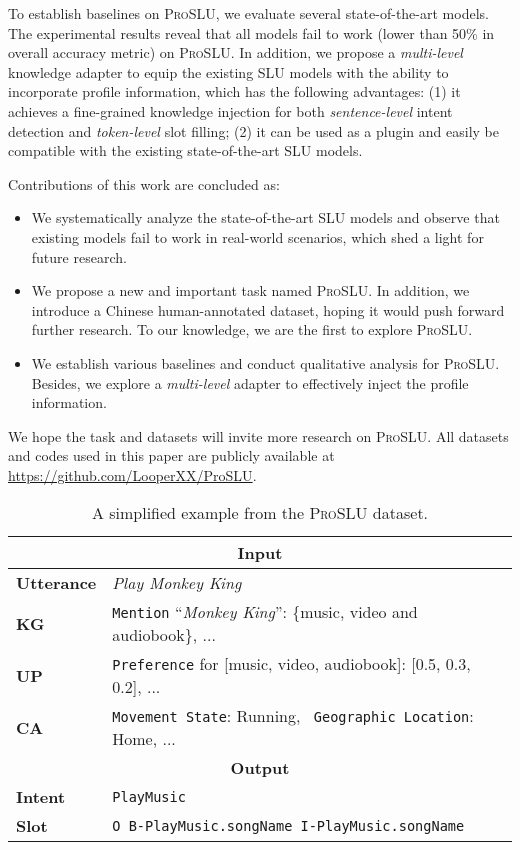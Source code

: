 \documentclass[letterpaper]{article} \usepackage{aaai22}  \usepackage{times}  \usepackage{helvet}  \usepackage{courier}  \usepackage[hyphens]{url}  \usepackage{graphicx} \urlstyle{rm} \def\UrlFont{\rm}  \usepackage{natbib}  \usepackage{caption} \DeclareCaptionStyle{ruled}{labelfont=normalfont,labelsep=colon,strut=off} \frenchspacing  \setlength{\pdfpagewidth}{8.5in}  \setlength{\pdfpageheight}{11in}  \usepackage{algorithm}
\begin{document}
To establish baselines on \textsc{ProSLU}, we evaluate several state-of-the-art models. The experimental results reveal that all models fail to work (lower than 50\% in overall accuracy metric) on \textsc{ProSLU}.
In addition, we propose a \textit{multi-level} knowledge adapter to equip the existing SLU models with the ability to incorporate profile information, which has the following advantages: 
(1) it achieves a fine-grained knowledge injection for both \textit{sentence-level} intent detection and \textit{token-level} slot filling; 
(2) it can be used as a plugin and easily be compatible with the existing state-of-the-art SLU models.


Contributions of this work are concluded as: 
\begin{itemize}
	\item We systematically analyze the state-of-the-art SLU models and observe that existing models fail to work in real-world scenarios, which shed a light for future research.
	\item 
	We propose a new and important task named \textsc{ProSLU}. In addition, we introduce a Chinese human-annotated dataset, hoping it would push forward further research. 
	To our knowledge, we are the first to explore \textsc{ProSLU}.
	\item We establish various baselines and conduct qualitative analysis for \textsc{ProSLU}. 
	Besides, we explore a \textit{multi-level} adapter to effectively inject the profile information.
\end{itemize}

We hope the task and datasets will invite more research on \textsc{ProSLU}. All datasets and codes used in this paper are publicly available at \url{https://github.com/LooperXX/ProSLU}. \begin{table}[t]
	\centering
	\begin{adjustbox}{width=0.48\textwidth}
		\begin{tabular}{l|l}
			\hline 
			\multicolumn{2}{c}{\textbf{Input}} \\ \hline
			\textbf{Utterance} & \textit{Play Monkey King} \\ \hline
			\textbf{KG} & \texttt{Mention} ``\textit{Monkey King}'': \{music, video and audiobook\}, ...\\ \hline
			\textbf{UP} & \texttt{Preference} for [music, video, audiobook]: {[}0.5, 0.3, 0.2{]},  ... \\ \hline
			\textbf{CA} & \texttt{Movement State}: Running, \ \texttt{Geographic Location}: Home, ... \\ \hline
			\hline
			\multicolumn{2}{c}{\textbf{Output}} \\ \hline
			\textbf{Intent}    & \texttt{PlayMusic} \\ \hline
			\textbf{Slot}      & \texttt{O B-PlayMusic.songName I-PlayMusic.songName} \\ \hline
		\end{tabular}
	\end{adjustbox}
	\caption{
		A simplified example from the \textsc{ProSLU} dataset.
	}
	\label{tab:example-simple}
\end{table}
\end{document}
